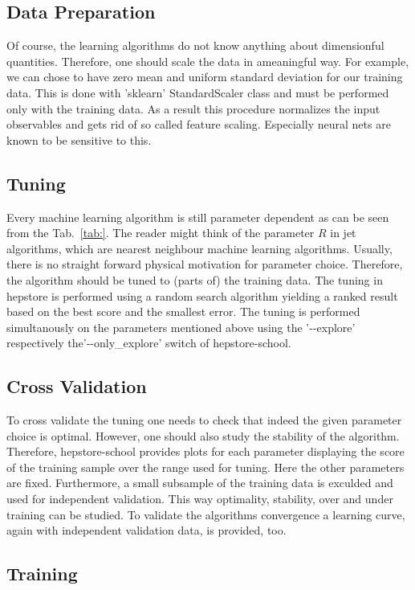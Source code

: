 \subsection{Data Preparation}
Of course, the learning algorithms do not know anything about
dimensionful quantities. Therefore, one should scale the data in
ameaningful way. For example, we can chose to have zero mean and
uniform standard deviation for our training data. This is done with
'sklearn' StandardScaler class and must be performed only with the
training data. As a result this procedure normalizes the input
observables and gets rid of so called feature scaling. Especially
neural nets are known to be sensitive to this.

\subsection{Tuning}
Every machine learning algorithm is still parameter dependent as can
be seen from the Tab.~\ref{tab:}. The reader might think of the
parameter $R$ in jet algorithms, which are nearest neighbour machine
learning algorithms. Usually, there is no straight forward physical
motivation for parameter choice. Therefore, the algorithm should be
tuned to (parts of) the training data. The tuning in hepstore is
performed using a random search algorithm yielding a ranked result
based on the best score and the smallest error. The tuning is
performed simultanously on the parameters mentioned above using the
'-{}-explore' respectively the'-{}-only\_explore' switch of
hepstore-school.

\subsection{Cross Validation}
To cross validate the tuning one needs to check that indeed the given
parameter choice is optimal. However, one should also study the
stability of the algorithm. Therefore, hepstore-school provides plots
for each parameter displaying the score of the training sample over
the range used for tuning. Here the other parameters are
fixed. Furthermore, a small subsample of the training data is exculded
and used for independent validation. This way optimality, stability,
over and under training can be studied. To validate the algorithms
convergence a learning curve, again with independent validation data,
is provided, too.

\subsection{Training}

